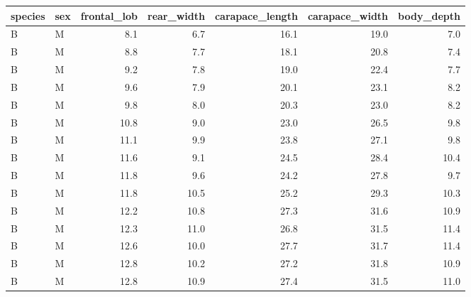 \begin{frame}
\begin{knitrout}
\color{fgcolor}
\begin{tabular}{l|l|r|r|r|r|r}
\hline
species & sex & frontal\_lob & rear\_width & carapace\_length & carapace\_width & body\_depth\\
\hline
B & M & 8.1 & 6.7 & 16.1 & 19.0 & 7.0\\
\hline
B & M & 8.8 & 7.7 & 18.1 & 20.8 & 7.4\\
\hline
B & M & 9.2 & 7.8 & 19.0 & 22.4 & 7.7\\
\hline
B & M & 9.6 & 7.9 & 20.1 & 23.1 & 8.2\\
\hline
B & M & 9.8 & 8.0 & 20.3 & 23.0 & 8.2\\
\hline
B & M & 10.8 & 9.0 & 23.0 & 26.5 & 9.8\\
\hline
B & M & 11.1 & 9.9 & 23.8 & 27.1 & 9.8\\
\hline
B & M & 11.6 & 9.1 & 24.5 & 28.4 & 10.4\\
\hline
B & M & 11.8 & 9.6 & 24.2 & 27.8 & 9.7\\
\hline
B & M & 11.8 & 10.5 & 25.2 & 29.3 & 10.3\\
\hline
B & M & 12.2 & 10.8 & 27.3 & 31.6 & 10.9\\
\hline
B & M & 12.3 & 11.0 & 26.8 & 31.5 & 11.4\\
\hline
B & M & 12.6 & 10.0 & 27.7 & 31.7 & 11.4\\
\hline
B & M & 12.8 & 10.2 & 27.2 & 31.8 & 10.9\\
\hline
B & M & 12.8 & 10.9 & 27.4 & 31.5 & 11.0\\
\hline
\end{tabular}


\end{knitrout}
\end{frame}

